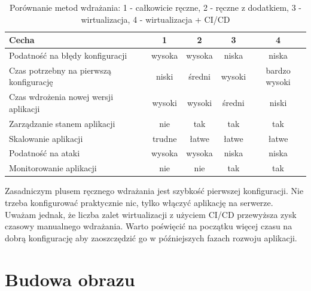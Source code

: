 \documentclass{article}
\begin{document}
\begin{table}[H]
\centering
\begin{tabular}{|l|c|c|c|c|}
\hline
\textbf{Cecha} & \textbf{1} & \textbf{2} & \textbf{3} & \textbf{4} \\ \hline
Podatność na błędy konfiguracji         & \cellcolor{red!50}wysoka & \cellcolor{red!50}wysoka & \cellcolor{green!50}niska & \cellcolor{green!50}niska \\ \hline
Czas potrzebny na pierwszą konfigurację & \cellcolor{green!50}niski & \cellcolor{yellow!50}średni & \cellcolor{red!50}wysoki & \cellcolor{red!50}bardzo wysoki \\ \hline
Czas wdrożenia nowej wersji aplikacji   & \cellcolor{red!50}wysoki & \cellcolor{red!50}wysoki & \cellcolor{yellow!50}średni & \cellcolor{green!50}niski \\ \hline
Zarządzanie stanem aplikacji            & \cellcolor{red!50}nie & \cellcolor{green!50}tak & \cellcolor{green!50}tak & \cellcolor{green!50}tak \\ \hline
Skalowanie aplikacji                    & \cellcolor{red!50}trudne & \cellcolor{green!50}łatwe & \cellcolor{green!50}łatwe & \cellcolor{green!50}łatwe \\ \hline
Podatność na ataki                      & \cellcolor{red!50}wysoka & \cellcolor{red!50}wysoka & \cellcolor{green!50}niska & \cellcolor{green!50}niska \\ \hline
Monitorowanie aplikacji                 & \cellcolor{red!50}nie & \cellcolor{red!50}nie & \cellcolor{green!50}tak & \cellcolor{green!50}tak \\ \hline
\end{tabular}
\caption{Porównanie metod wdrażania: 1 - całkowicie ręczne, 2 - ręczne z dodatkiem, 3 - wirtualizacja, 4 - wirtualizacja + CI/CD}
\label{tab:porownanie-metod-wdrazania}
\end{table}

Zasadniczym plusem ręcznego wdrażania jest szybkość pierwszej konfiguracji. Nie trzeba konfigurować praktycznie nic, tylko włączyć aplikację na serwerze. Uważam jednak, że liczba zalet wirtualizacji z użyciem CI/CD przewyższa zysk czasowy manualnego wdrażania. Warto poświęcić na początku więcej czasu na dobrą konfigurację aby zaoszczędzić go w późniejszych fazach rozwoju aplikacji.


\section{Budowa obrazu}
\end{document}

